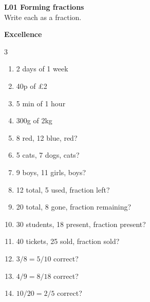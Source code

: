\documentclass[17pt,a4paper,landscape]{extarticle}
\begin{document}
\sffamily
\boldmath

\boldmath

\boldmath

\boldmath

\boldmath

\boldmath





{\LARGE \textbf{L01 Forming fractions}}\\[0.35em]
Write each as a fraction.

\vspace{2.6em}
{\LARGE \textbf{Excellence}}
\begin{multicols}{3}
\begin{enumerate}[
  itemsep=7.9em,
  label=\textbf{\arabic*.}, 
  labelwidth=2.2em,
  labelsep=0.75em,
  leftmargin=!,
  align=left
]
\item 2 days of 1 week
\item 40p of £2
\item 5 min of 1 hour
\item 300g of 2kg
\item 8 red, 12 blue, red?
\item 5 cats, 7 dogs, cats?
\item 9 boys, 11 girls, boys?
\item 12 total, 5 used, fraction left?
\item 20 total, 8 gone, fraction remaining?
\item 30 students, 18 present, fraction present?
\item 40 tickets, 25 sold, fraction sold?
\item $3/8 = 5/10$ correct?
\item $4/9 = 8/18$ correct?
\item $10/20 = 2/5$ correct?
\end{enumerate}
\end{multicols}
\end{document}
